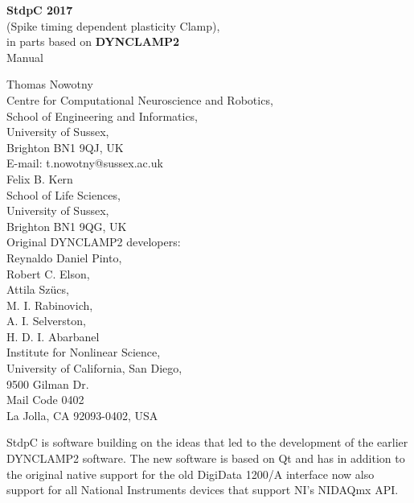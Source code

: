 \documentclass{article}
\begin{document}
\begin{titlepage}
  \begin{center}
  {{\bf \Large 
    StdpC 2017 }\\[0.3cm]
    \large (Spike timing dependent plasticity Clamp)}, \\[1cm]
  {\large 
    in parts based on {\bf DYNCLAMP2} \cite{Pinto2001} 
  } \\[2cm]
  {\sc \Large Manual }
  \end{center}
\vspace*{2cm}

\noindent
{\large Thomas Nowotny} \\[0.5cm]
Centre for Computational Neuroscience and Robotics, \\
School of Engineering and Informatics, \\
University of Sussex, \\
Brighton BN1 9QJ, UK \\
E-mail: t.nowotny@sussex.ac.uk
 \\[1cm]
{\large Felix B. Kern} \\[0.5cm]
School of Life Sciences, \\
University of Sussex, \\
Brighton BN1 9QG, UK
 \\[1cm]
Original DYNCLAMP2 developers: \\[0.2cm]
Reynaldo Daniel Pinto, \\
Robert C. Elson, \\
Attila Sz\"ucs, \\
M. I. Rabinovich, \\
A. I. Selverston,  \\
H. D. I. Abarbanel \\[0.5cm]
Institute for Nonlinear Science, \\
University of California, San Diego, \\
9500 Gilman Dr. \\ Mail Code 0402 \\
La Jolla, CA 92093-0402, USA \\

\end{titlepage}

StdpC is software building on the ideas that led
to the development of the earlier DYNCLAMP2
software. The new software is based on Qt and has in addition to the
original native support for the old DigiData 1200/A interface now also
support for all National Instruments devices that support NI's NIDAQmx
API.
 
\end{document}

